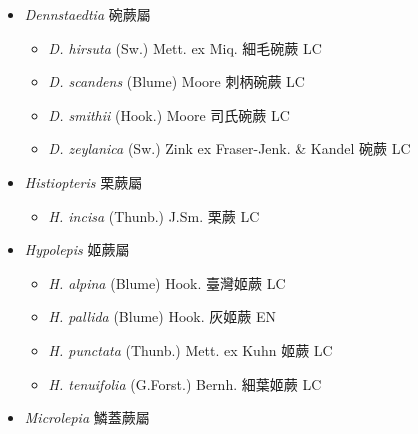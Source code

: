 
  \begin{itemize}
 \item[] \textit{Dennstaedtia} 碗蕨屬
                                
  \begin{itemize}
        \item[] \textit{D. hirsuta} (Sw.) Mett. ex Miq.  細毛碗蕨   LC
        \item[] \textit{D. scandens} (Blume) Moore  刺柄碗蕨   LC
        \item[] \textit{D. smithii} (Hook.) Moore  司氏碗蕨   LC
        \item[] \textit{D. zeylanica} (Sw.) Zink ex Fraser-Jenk. \& Kandel  碗蕨   LC
  \end{itemize}
 \item[] \textit{Histiopteris} 栗蕨屬
                                
  \begin{itemize}
        \item[] \textit{H. incisa} (Thunb.) J.Sm.  栗蕨   LC
  \end{itemize}
 \item[] \textit{Hypolepis} 姬蕨屬
                                
  \begin{itemize}
        \item[] \textit{H. alpina} (Blume) Hook.  臺灣姬蕨   LC
        \item[] \textit{H. pallida} (Blume) Hook.  灰姬蕨   EN
        \item[] \textit{H. punctata} (Thunb.) Mett. ex Kuhn  姬蕨   LC
        \item[] \textit{H. tenuifolia} (G.Forst.) Bernh.  細葉姬蕨   LC
  \end{itemize}
 \item[] \textit{Microlepia} 鱗蓋蕨屬
                                

\end{itemize}
